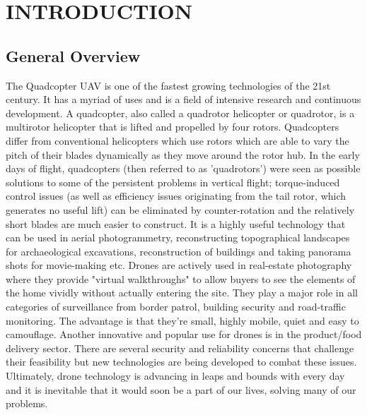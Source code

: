 
\chapter{INTRODUCTION} %
\section{General Overview} %
The Quadcopter UAV is one of the fastest growing technologies of the 21st century. It has a myriad of uses and is a field of intensive research and continuous development. 
A quadcopter, also called a quadrotor helicopter or quadrotor, is a multirotor helicopter that is lifted and propelled by four rotors. Quadcopters differ from conventional helicopters which use rotors which are able to vary the pitch of their blades dynamically as they move around the rotor hub. In the early days of flight, quadcopters (then referred to as 'quadrotors') were seen as possible solutions to some of the persistent problems in vertical flight; torque-induced control issues (as well as efficiency issues originating from the tail rotor, which generates no useful lift) can be eliminated by counter-rotation and the relatively short blades are much easier to construct.
\newline
\newline
It is a highly useful technology that can be used in aerial photogrammetry, reconstructing topographical landscapes for archaeological excavations, reconstruction of buildings and taking panorama shots for movie-making etc. Drones are actively used in real-estate photography where they provide "virtual walkthroughs" to allow buyers to see the elements of the home vividly without actually entering the site. They play a major role in all categories of surveillance from border patrol, building security and road-traffic monitoring. The advantage is that they're small, highly mobile, quiet and easy to camouflage. Another innovative and popular use for drones is in the product/food delivery sector. There are several security and reliability concerns that challenge their feasibility but new technologies are being developed to combat these issues.
\newline \newline
Ultimately, drone technology is advancing in leaps and bounds with every day and it is inevitable that it would soon be a part of our lives, solving many of our problems.


